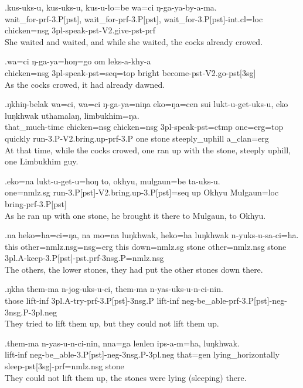 \exg.kus-uks-u,  kus-uks-u,  kus-u-lo=be   wa=ci ŋ-ga-ya-by-a-ma.\\
wait\_for{\sc -prf-3.P[pst]}, wait\_for-prf-3.P[pst], wait\_for{\sc -3.P[pst]-int.cl=loc} chicken{\sc =nsg} {\sc 3pl-}speak{\sc -pst-V2.give-pst-prf}\\
She waited and waited, and while she waited, the cocks already crowed.

\exg.wa=ci ŋ-ga-ya=hoŋ=go  om leks-a-khy-a\\
chicken{\sc =nsg} {\sc 3pl-}speak{\sc -pst=seq=top}  bright become{\sc -pst-V2.go-pst[3sg]}\\
As the cocks crowed, it  had already dawned.

\exg.ŋkhiŋ-belak wa=ci, wa=ci ŋ-ga-ya=niŋa  eko=ŋa=cen  sui lukt-u-get-uks-u,   eko luŋkhwak uthamalaŋ, limbukhim=ŋa.\\
that\_much-time chicken{\sc =nsg} chicken{\sc =nsg} {\sc 3pl-}speak{\sc -pst=ctmp} one{\sc =erg=top}  quickly run{\sc -3.P-V2.bring.up-prf-3.P} one stone steeply\_uphill a\_clan{\sc =erg}\\
At that time, while the cocks crowed, one ran up with the stone, steeply uphill, one Limbukhim guy.

\exg.eko=na  lukt-u-get-u=hoŋ     to, okhyu, mulgaun=be  ta-uks-u.\\
one{\sc =nmlz.sg} run{\sc -3.P[pst]-V2.bring.up-3.P[pst]=seq}  up Okhyu Mulgaun{\sc =loc} bring{\sc -prf-3.P[pst]}\\
As he ran up with one stone, he brought it there to Mulgaun, to Okhyu.

\exg.na heko=ha=ci=ŋa,   na mo=na  luŋkhwak, heko=ha  luŋkhwak n-yuks-u-sa-ci=ha.\\
this other{\sc =nmlz.nsg=nsg=erg} this down{\sc =nmlz.sg} stone other{\sc =nmlz.nsg} stone {\sc 3pl.A-}keep{\sc -3.P[pst]-pst.prf-3nsg.P=nmlz.nsg}\\
The others, the lower stones, they had put the other stones down there.

\exg.ŋkha them-ma n-jog-uks-u-ci,    them-ma n-yas-uks-u-n-ci-nin.\\
those lift{\sc -inf} {\sc 3pl.A-}try{\sc -prf-3.P[pst]-3nsg.P} lift{\sc -inf} {\sc neg-}be\_able{\sc -prf-3.P[pst]-neg-3nsg.P-3pl.neg}\\
They tried to lift them up, but they could not lift them up.

\exg.them-ma n-yas-u-n-ci-nin,     nna=ga lenlen  ips-a-m=ha,    luŋkhwak.\\
lift{\sc -inf} {\sc neg-}be\_able{\sc -3.P[pst]-neg-3nsg.P-3pl.neg} that{\sc =gen} lying\_horizontally sleep{\sc -pst[3sg]-prf=nmlz.nsg} stone\\
They could not lift them up, the stones were lying (sleeping) there.

